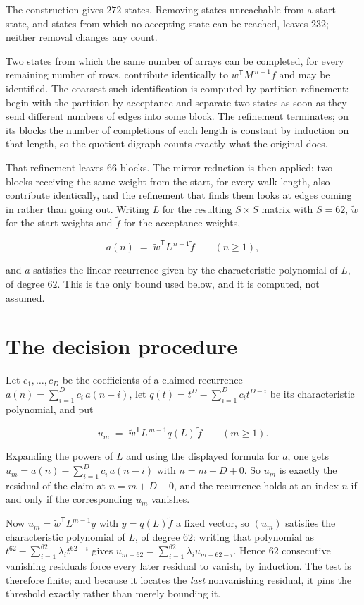 \documentclass[11pt]{article}
\theoremstyle{definition}
\begin{document}
The construction gives $272$ states. Removing states unreachable from a start state, and states from which no accepting state can be reached, leaves $232$; neither removal changes any count.

Two states from which the same number of arrays can be completed, for every remaining number of rows, contribute identically to $w^{\mathsf T}M^{\,n-1}f$ and may be identified. The coarsest such identification is computed by partition refinement: begin with the partition by acceptance and separate two states as soon as they send different numbers of edges into some block. The refinement terminates; on its blocks the number of completions of each length is constant by induction on that length, so the quotient digraph counts exactly what the original does.

That refinement leaves $66$ blocks. The mirror reduction is then applied: two blocks receiving the same weight from the start, for every walk length, also contribute identically, and the refinement that finds them looks at edges coming in rather than going out. Writing $L$ for the resulting $S \times S$ matrix with $S = 62$, $\tilde w$ for the start weights and $\tilde f$ for the acceptance weights,

\[a(n) \;=\; \tilde w^{\mathsf T} L^{\,n-1} \tilde f \qquad (n \ge 1),\]

and $a$ satisfies the linear recurrence given by the characteristic polynomial of $L$, of degree $62$. This is the only bound used below, and it is computed, not assumed.

\section{The decision procedure}

Let $c_1,\dots,c_D$ be the coefficients of a claimed recurrence $a(n) = \sum_{i=1}^{D} c_i\,a(n-i)$, let $q(t) = t^{D} - \sum_{i=1}^{D} c_i t^{D-i}$ be its characteristic polynomial, and put

\[u_m \;=\; \tilde w^{\mathsf T} L^{\,m-1} q(L)\,\tilde f \qquad (m \ge 1).\]

Expanding the powers of $L$ and using the displayed formula for $a$, one gets $u_m = a(n) - \sum_{i=1}^{D} c_i\,a(n-i)$ with $n = m + D + 0$. So $u_m$ is exactly the residual of the claim at $n = m + D + 0$, and the recurrence holds at an index $n$ if and only if the corresponding $u_m$ vanishes.

Now $u_m = \tilde w^{\mathsf T} L^{m-1} y$ with $y = q(L)\tilde f$ a fixed vector, so $(u_m)$ satisfies the characteristic polynomial of $L$, of degree $62$: writing that polynomial as $t^{62} - \sum_{i=1}^{62} \lambda_i t^{62-i}$ gives $u_{m+62} = \sum_{i=1}^{62} \lambda_i u_{m+62-i}$. Hence $62$ consecutive vanishing residuals force every later residual to vanish, by induction. The test is therefore finite; and because it locates the {\itshape last} nonvanishing residual, it pins the threshold exactly rather than merely bounding it.
\end{document}

